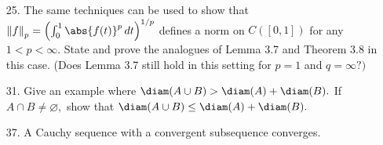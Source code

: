 \documentclass{article}
\begin{document}
\begin{itemize}
	\item[25.] The same techniques can be used to show that $\left\lVert f \right\rVert_p = \left( \int_0^1 \abs{f(t)}^p\, dt \right)^{1/p}$ defines a norm on $C\left( [0, 1] \right)$ for any $1<p<\infty.$ State and prove the analogues of Lemma 3.7 and Theorem 3.8 in this case. (Does Lemma 3.7 still hold in this setting for $p=1$ and $q=\infty?)$

	\item[31.] Give an example where $\diam(A\cup B)>\diam(A)+\diam(B).$ If $A\cap B\neq\varnothing,$ show that $\diam(A\cup B)\le \diam(A)+\diam(B).$

	\item[37.] A Cauchy sequence with a convergent subsequence converges.
		
\end{itemize}
\end{document}
